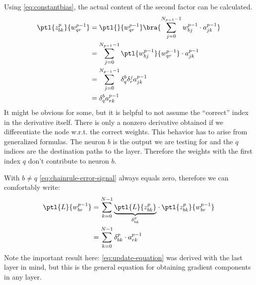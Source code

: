 Using \eqref{eq:constantbias}, the actual content of the second factor can be calculated.
\begin{align}
	\ptl{z_{bk}^p}{w_{qr}^{p-1}}&=\ptl{}{w_{qr}^{p-1}}\bra{\sum\limits_{j=0}^{N_{p-1}-1}w_{bj}^{p-1}\cdot a_{jk}^{p-1}}\\
	&=\sum\limits_{j=0}^{N_{p-1}-1}\ptl{w_{bj}^{p-1}}{w_{qr}^{p-1}}\cdot a_{jk}^{p-1}\\
	&=\sum\limits_{j=0}^{N_{p-1}-1}\delta^b_q\delta^j_ra_{jk}^{p-1}\\
	&=\delta^b_qa_{rk}^{p-1}
\end{align}
It might be obvious for some, but it is helpful to not assume the \enquote{correct} index in the derivative itself. There is only a nonzero derivative obtained if we differentiate the node w.r.t. the correct weights. This behavior has to arise from generalized formulas. The neuron $b$ is the output we are testing for and the $q$ indices are the destination paths to the layer. Therefore the weights with the first index $q$ don't contribute to neuron $b$.\par
With $b\neq q$ \eqref{eq:chainrule-error-signal} always equals zero, therefore we can comfortably write:
\begin{align}
	\ptl{L}{w_{br}^{p-1}}&=\sum\limits_{k=0}^{N-1}\underset{\delta_{bk}^p}{\underbrace{\ptl{L}{z_{bk}^p}}}\cdot\ptl{z_{bk}^p
	}{w_{br}^{p-1}}\\
	\label{eq:update-equation}
	&=\sum\limits_{k=0}^{N-1}\delta^p_{bk}\cdot a_{rk}^{p-1}
\end{align}
Note the important result here: \eqref{eq:update-equation} was derived with the last layer in mind, but this is the general equation for obtaining gradient components in any layer.
